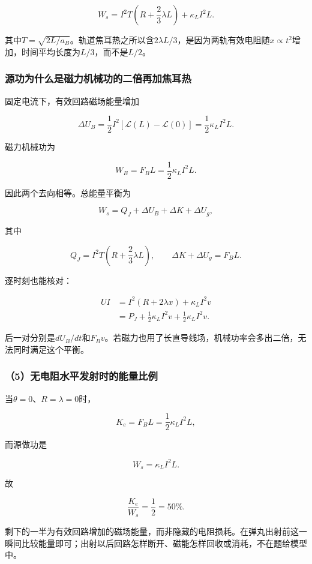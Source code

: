 \documentclass[12pt,a4paper,fontset=fandol]{ctexart}
\begin{document}
\[
\boxed{
W_s=I^2T\left(R+\frac23\lambda L\right)
+\kappa_LI^2L}.
\]

其中\(T=\sqrt{2L/a_B}\)。轨道焦耳热之所以含\(2\lambda L/3\)，是因为两轨有效电阻随\(x\propto t^2\)增加，时间平均长度为\(L/3\)，而不是\(L/2\)。

\subsubsection{源功为什么是磁力机械功的二倍再加焦耳热}\label{ux6e90ux529fux4e3aux4ec0ux4e48ux662fux78c1ux529bux673aux68b0ux529fux7684ux4e8cux500dux518dux52a0ux7126ux8033ux70ed}

固定电流下，有效回路磁场能量增加

\[
\Delta U_B=\frac12I^2[\mathcal L(L)-\mathcal L(0)]
=\frac12\kappa_LI^2L.
\]

磁力机械功为

\[
W_B=F_BL=\frac12\kappa_LI^2L.
\]

因此两个去向相等。总能量平衡为

\[
\boxed{
W_s=Q_J+\Delta U_B+\Delta K+\Delta U_g},
\]

其中

\[
Q_J=I^2T\left(R+\frac23\lambda L\right),
\qquad
\Delta K+\Delta U_g=F_BL.
\]

逐时刻也能核对：

\[
\begin{aligned}
UI
&=I^2(R+2\lambda x)+\kappa_LI^2v\\
&=P_J+\frac12\kappa_LI^2v+\frac12\kappa_LI^2v.
\end{aligned}
\]

后一对分别是\(dU_B/dt\)和\(F_Bv\)。若磁力也用了长直导线场，机械功率会多出二倍，无法同时满足这个平衡。

\subsubsection{（5）无电阻水平发射时的能量比例}\label{ux65e0ux7535ux963bux6c34ux5e73ux53d1ux5c04ux65f6ux7684ux80fdux91cfux6bd4ux4f8b}

当\(\theta=0\)、\(R=\lambda=0\)时，

\[
K_e=F_BL=\frac12\kappa_LI^2L,
\]

而源做功是

\[
W_s=\kappa_LI^2L.
\]

故

\[
\boxed{\frac{K_e}{W_s}=\frac12=50\%}.
\]

剩下的一半为有效回路增加的磁场能量，而非隐藏的电阻损耗。在弹丸出射前这一瞬间比较能量即可；出射以后回路怎样断开、磁能怎样回收或消耗，不在题给模型中。
\end{document}
